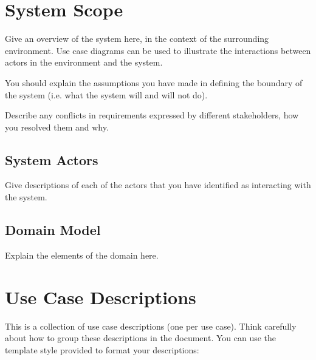 \documentclass{l3deliverable}
\begin{document}

\section{System Scope}

Give an overview of the system here, in the context of the surrounding
environment.  Use case diagrams can be used to illustrate the
interactions between actors in the environment and the system.

You should explain the assumptions you have made in defining the
boundary of the system (i.e. what the system will and will not do).

Describe any conflicts in requirements expressed by different
stakeholders, how you resolved them and why.


\subsection{System Actors}

Give descriptions of each of the actors that you have identified as
interacting with the system.


\subsection{Domain Model}

Explain the elements of the domain here.


\section{Use Case Descriptions}

This is a collection of use case descriptions (one per use case).
Think carefully about how to group these descriptions in the document.
You can use the template style provided to format your descriptions:

\begin{UseCaseTemplate}
\UseCaseLabel{}
\UseCaseDescription{}
\UseCaseRationale{}
\UseCasePriority{}
\UseCaseStatus{}
\UseCaseActors{}
\UseCaseExtensions{}
\UseCaseIncludes{}
\UseCaseConditions{}
\UseCaseNonFunctionalRequirements{}
\UseCaseScenarios{}
\UseCaseRisks{}
\UseCaseUserInterface{}
\end{UseCaseTemplate}
\end{document}

